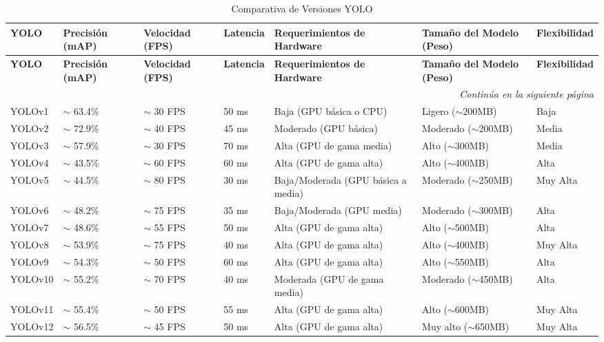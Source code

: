\renewcommand{\arraystretch}{1.5}
\begin{longtable}{|p{1.8cm}|p{2cm}|p{2cm}|p{1.8cm}|p{3cm}|p{2cm}|p{2.3cm}|}
\caption{Comparativa de Versiones YOLO} \label{tab:comparativa_yolo} \\

\hline
\textbf{YOLO} & \textbf{Precisión (mAP)} & \textbf{Velocidad (FPS)} & \textbf{Latencia} & \textbf{Requerimientos de Hardware} & \textbf{Tamaño del Modelo (Peso)} & \textbf{Flexibilidad} \\
\hline
\endfirsthead

\hline
\textbf{YOLO} & \textbf{Precisión (mAP)} & \textbf{Velocidad (FPS)} & \textbf{Latencia} & \textbf{Requerimientos de Hardware} & \textbf{Tamaño del Modelo (Peso)} & \textbf{Flexibilidad} \\
\hline
\endhead

\hline
\multicolumn{7}{r}{\textit{Continúa en la siguiente página}} \\
\endfoot

\hline
\endlastfoot

YOLOv1 & $\sim$ 63.4\% & $\sim$ 30 FPS & 50 ms & Baja (GPU básica o CPU) & Ligero ($\sim$200MB) & Baja \\ \hline
YOLOv2 & $\sim$ 72.9\% & $\sim$ 40 FPS & 45 ms & Moderado (GPU básica) & Moderado ($\sim$200MB) & Media \\ \hline
YOLOv3 & $\sim$ 57.9\% & $\sim$ 30 FPS & 70 ms & Alta (GPU de gama media) & Alto ($\sim$300MB) & Media \\ \hline
YOLOv4 & $\sim$ 43.5\% & $\sim$ 60 FPS & 60 ms & Alta (GPU de gama alta) & Alto ($\sim$400MB) & Alta \\ \hline
YOLOv5 & $\sim$ 44.5\% & $\sim$ 80 FPS & 30 ms & Baja/Moderada (GPU básica a media) & Moderado ($\sim$250MB) & Muy Alta \\ \hline
YOLOv6 & $\sim$ 48.2\% & $\sim$ 75 FPS & 35 ms & Baja/Moderada (GPU media) & Moderado ($\sim$300MB) & Alta \\ \hline
YOLOv7 & $\sim$ 48.6\% & $\sim$ 55 FPS & 50 ms & Alta (GPU de gama alta) & Alto ($\sim$500MB) & Alta \\ \hline
YOLOv8 & $\sim$ 53.9\% & $\sim$ 75 FPS & 40 ms & Alta (GPU de gama alta) & Alto ($\sim$400MB) & Muy Alta \\ \hline
YOLOv9 & $\sim$ 54.3\% & $\sim$ 50 FPS & 60 ms & Alta (GPU de gama alta) & Alto ($\sim$550MB) & Alta \\ \hline
YOLOv10 & $\sim$ 55.2\% & $\sim$ 70 FPS & 40 ms & Moderada (GPU de gama media) & Moderado ($\sim$450MB) & Alta \\ \hline
YOLOv11 & $\sim$ 55.4\% & $\sim$ 50 FPS & 55 ms & Alta (GPU de gama alta) & Alto ($\sim$600MB) & Muy Alta \\ \hline
YOLOv12 & $\sim$ 56.5\% & $\sim$ 45 FPS & 50 ms & Alta (GPU de gama alta) & Muy alto ($\sim$650MB) & Muy Alta \\ \hline

\end{longtable}



